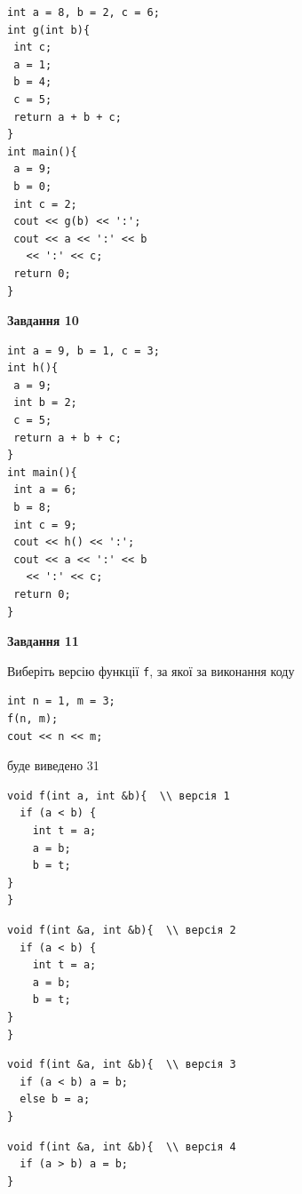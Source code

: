 \documentclass[12pt, ukrainian]{article}
\def\code#1{\Verb!#1!}
\begin{document}
{\begin {large}
\begin{minipage}[t]{7.0cm}
\begin{verbatim}
int a = 8, b = 2, c = 6;
int g(int b){
 int c;
 a = 1;
 b = 4;
 c = 5;
 return a + b + c;
}
int main(){
 a = 9;
 b = 0;
 int c = 2;
 cout << g(b) << ':';
 cout << a << ':' << b 
   << ':' << c;
 return 0;
}
\end{verbatim}



\begin{center}
\textbf{Завдання 10}
\end{center}
\vspace{-8mm}

\begin{verbatim}
int a = 9, b = 1, c = 3;
int h(){
 a = 9;
 int b = 2;
 c = 5;
 return a + b + c;
}
int main(){
 int a = 6;
 b = 8;
 int c = 9;
 cout << h() << ':';
 cout << a << ':' << b 
   << ':' << c;
 return 0;
}
\end{verbatim}

\end{minipage}
\vline \hspace{1mm}
\begin{minipage}[t]{11.0cm}

\begin{center}
\textbf{Завдання 11}
\end{center}
Виберіть версію функції \code{f}, за якої за виконання коду
\begin{verbatim}
int n = 1, m = 3;
f(n, m);
cout << n << m;
\end{verbatim}

буде виведено 31

\begin{verbatim}
void f(int a, int &b){  \\ версія 1
  if (a < b) {
    int t = a;
    a = b;
    b = t;
}  
}
\end{verbatim}

\vspace{-8mm}\begin{verbatim}
void f(int &a, int &b){  \\ версія 2
  if (a < b) {
    int t = a;
    a = b;
    b = t;
}  
}
\end{verbatim}

\vspace{-8mm}\begin{verbatim}
void f(int &a, int &b){  \\ версія 3
  if (a < b) a = b;
  else b = a;
}
\end{verbatim}

\vspace{-8mm}\begin{verbatim}
void f(int &a, int &b){  \\ версія 4
  if (a > b) a = b;
}
\end{verbatim}




\end{minipage}
\end{large}}
\end{document}
